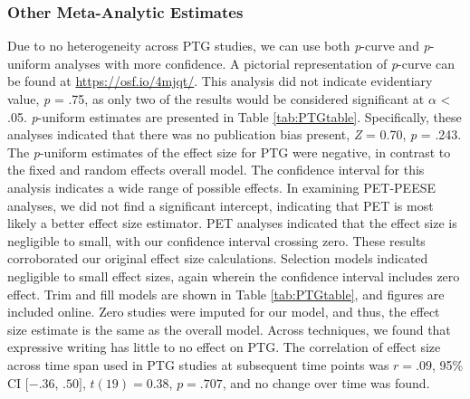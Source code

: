\documentclass[english,man]{apa6}
\theoremstyle{definition}
\theoremstyle{definition}
\theoremstyle{definition}
\theoremstyle{remark}
\begin{document}
\subsubsection{Other Meta-Analytic
Estimates}\label{other-meta-analytic-estimates-1}

Due to no heterogeneity across PTG studies, we can use both
\emph{p}-curve and \emph{p}-uniform analyses with more confidence. A
pictorial representation of \emph{p}-curve can be found at
\url{https://osf.io/4mjqt/}. This analysis did not indicate evidentiary
value, \emph{p} = .75, as only two of the results would be considered
significant at \(\alpha\) \textless{} .05. \emph{p}-uniform estimates
are presented in Table \ref{tab:PTGtable}. Specifically, these analyses
indicated that there was no publication bias present, \emph{Z} = 0.70,
\emph{p} = .243. The \emph{p}-uniform estimates of the effect size for
PTG were negative, in contrast to the fixed and random effects overall
model. The confidence interval for this analysis indicates a wide range
of possible effects. In examining PET-PEESE analyses, we did not find a
significant intercept, indicating that PET is most likely a better
effect size estimator. PET analyses indicated that the effect size is
negligible to small, with our confidence interval crossing zero. These
results corroborated our original effect size calculations. Selection
models indicated negligible to small effect sizes, again wherein the
confidence interval includes zero effect. Trim and fill models are shown
in Table \ref{tab:PTGtable}, and figures are included online. Zero
studies were imputed for our model, and thus, the effect size estimate
is the same as the overall model. Across techniques, we found that
expressive writing has little to no effect on PTG. The correlation of
effect size across time span used in PTG studies at subsequent time
points was \(r = .09\), 95\% CI \([-.36\), \(.50]\), \(t(19) = 0.38\),
\(p = .707\), and no change over time was found.
\end{document}
